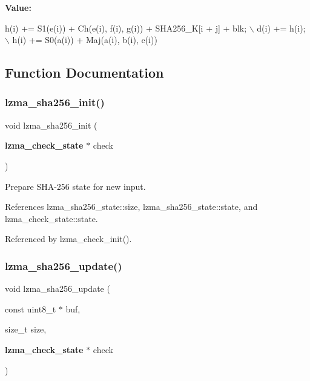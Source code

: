 {\bfseries Value\+:}
\begin{DoxyCode}
h(i) += S1(e(i)) + Ch(e(i), f(i), g(i)) + SHA256\_K[i + j] + blk; \(\backslash\)
        d(i) += h(i); \(\backslash\)
        h(i) += S0(a(i)) + Maj(a(i), b(i), c(i))
\end{DoxyCode}


\subsection{Function Documentation}
\mbox{\label{sha256_8c_a50600904325e18ab14051ee24bd3264b}} 
\subsubsection{lzma\+\_\+sha256\+\_\+init()}
{\footnotesize\ttfamily void lzma\+\_\+sha256\+\_\+init (\begin{DoxyParamCaption}\item[{\textbf{ lzma\+\_\+check\+\_\+state} $\ast$}]{check }\end{DoxyParamCaption})}



Prepare S\+H\+A-\/256 state for new input. 



References lzma\+\_\+sha256\+\_\+state\+::size, lzma\+\_\+sha256\+\_\+state\+::state, and lzma\+\_\+check\+\_\+state\+::state.



Referenced by lzma\+\_\+check\+\_\+init().

\mbox{\label{sha256_8c_a35110ebc966a6e20c018151ddb556e4a}} 
\subsubsection{lzma\+\_\+sha256\+\_\+update()}
{\footnotesize\ttfamily void lzma\+\_\+sha256\+\_\+update (\begin{DoxyParamCaption}\item[{const uint8\+\_\+t $\ast$}]{buf,  }\item[{size\+\_\+t}]{size,  }\item[{\textbf{ lzma\+\_\+check\+\_\+state} $\ast$}]{check }\end{DoxyParamCaption})}



